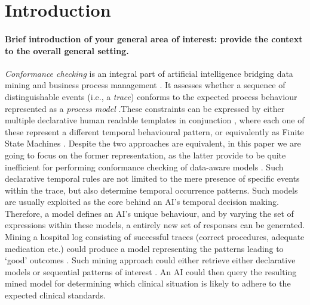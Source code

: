 \section{Introduction}

\paragraph*{Brief introduction of your general area of interest: provide the \textbf{context} to the overall general setting.} \textit{Conformance checking} is an integral part of artificial intelligence bridging data mining and business process management \cite{bpm21}. It assesses whether a sequence of distinguishable events (i.e., a \textit{trace}) conforms to the expected process behaviour represented as a \textit{process model} \cite{RozinatA08}.These constraints can be expressed by either multiple declarative human readable templates in conjunction \cite{Li2020}, where each one of these represent a different temporal behavioural pattern, or equivalently as Finite State Machines \cite{AgostinelliBFMM21}. %
Despite the two approaches are equivalent, in this paper we are going to focus on the former representation, as the latter provide to be quite inefficient for performing conformance checking of data-aware models \cite{bpm21}. Such declarative temporal rules are not limited to the mere presence of specific events within the trace, but also determine temporal occurrence patterns. Such models are usually exploited as the core behind an AI's temporal decision making. Therefore, a model defines an AI's unique behaviour, and by varying the set of expressions within these models, a entirely new set of responses can be generated.  Mining a hospital log consisting of successful traces (correct procedures, adequate medication etc.) could produce a model representing the patterns leading to `good' outcomes  \cite{Amantea2020}. Such mining approach could either retrieve either declarative models or sequential patterns of interest \cite{mining}. An AI could then query the resulting mined model for determining which clinical situation is likely to adhere to the expected clinical standards.

